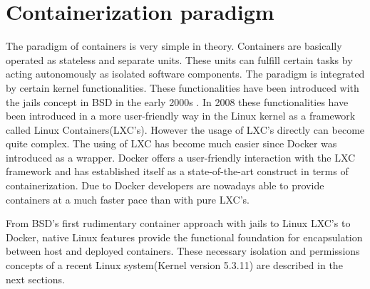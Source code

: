 \section{Containerization paradigm}
\label{sec:intro:containerization}
%
% 
The paradigm of containers is very simple in theory. Containers are basically operated as stateless and separate units. These units can fulfill certain tasks by acting autonomously as isolated software components.
The paradigm is integrated by certain kernel functionalities. These functionalities have been introduced with the jails concept in BSD in the early 2000s \cite{Souppaya:2017aa}. In 2008 these functionalities have been introduced in a more user-friendly way in the Linux kernel \cite{Souppaya:2017aa} as a framework called Linux Containers(LXC's).
However the usage of LXC's directly can become quite complex. The using of LXC has become much easier since Docker was introduced as a wrapper. Docker offers a user-friendly interaction with the LXC framework and has established itself as a state-of-the-art construct in terms of containerization.
Due to Docker developers are nowadays able to provide containers at a much faster pace than with pure LXC's. 
	
From BSD's first rudimentary container approach with jails to Linux LXC's to Docker, native Linux features provide the functional foundation for encapsulation between host and deployed containers.
These necessary isolation and permissions concepts of a recent Linux system(Kernel version 5.3.11) are described in the next sections.
